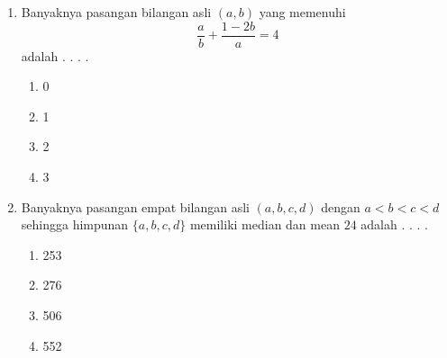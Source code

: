 \documentclass[12pt]{scrartcl}
\begin{document}
\begin{enumerate}
    \item Banyaknya pasangan bilangan asli $(a,b)$ yang memenuhi
    $$\frac{a}{b} + \frac{1-2b}{a} =4$$
    adalah . . . .
    \begin{enumerate}[label={(\Alph*)}]
        \item 0 \item 1 \item 2 \item 3
    \end{enumerate}

    \item Banyaknya pasangan empat bilangan asli $(a,b,c,d)$ dengan $a<b<c<d$ sehingga himpunan $\{a,b,c,d\}$ memiliki median dan mean $24$ adalah . . . .
    \begin{enumerate}[label={(\Alph*)}]
        \item 253 \item 276 \item 506 \item 552
    \end{enumerate}
\end{enumerate}
\end{document}
